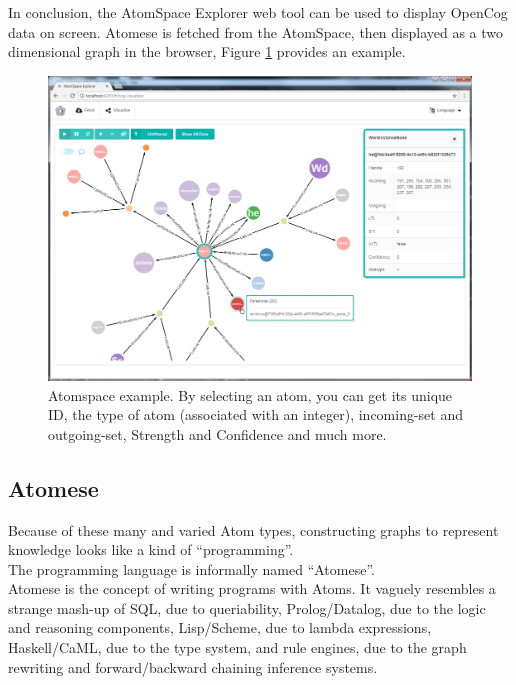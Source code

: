 In conclusion, the AtomSpace Explorer web tool can be used to display OpenCog data on screen. Atomese is fetched from the AtomSpace, then displayed as a two dimensional graph in the browser, Figure \ref{fig:atomspace_explorer} provides an example. 

\begin{figure}[h]
\centering
\includegraphics[width=1.0
\textwidth]{figures/Magistrale/atomspace_explorer}
\caption[AtomSpace Explorer ]{Atomspace example. By selecting an atom, you can get its unique ID, the type of atom (associated with an integer), incoming-set and outgoing-set, Strength and Confidence and much more.
\label{fig:atomspace_explorer}}
\end{figure}


\subsection{Atomese}\label{sec:atomese}

Because of these many and varied Atom types, constructing graphs to represent knowledge looks like a kind of \enquote{programming}. \\
The programming language is informally named \enquote{Atomese}. \\ 
Atomese is the concept of writing programs with Atoms. 
It vaguely resembles a strange mash-up of SQL, due to queriability, Prolog/Datalog, due to the logic and reasoning components, Lisp/Scheme, due to lambda expressions, Haskell/CaML, due to the type system, and rule engines, due to the graph rewriting and forward/backward chaining inference systems. \\

